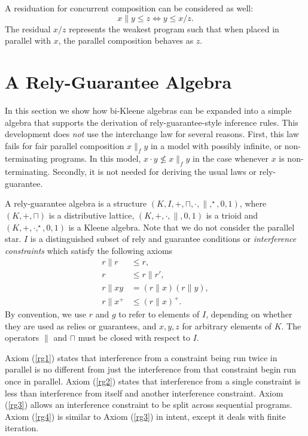 \documentclass{llncs}
\begin{document}
A residuation for concurrent composition can be considered as well:
\begin{equation*}
x\|y \le z \Leftrightarrow y \le x/z.
\end{equation*}
The residual $x/z$ represents the weakest program such that when
placed in parallel with $x$, the parallel composition behaves as $z$.


\section{A  Rely-Guarantee Algebra}
\label{sec:RG}

In this section we show how bi-Kleene algebras can be expanded into a
simple algebra that supports the derivation of rely-guarantee-style
inference rules. This development does \emph{not} use the interchange
law for several reasons. First, this law fails for fair parallel
composition $x\parallel_f y$ in a model with possibly infinite, or
non-terminating programs. In this model, $x \cdot y \not\leq x
\parallel_f y$ in the case whenever $x$ is non-terminating. Secondly,
it is not needed for deriving the usual laws or rely-guarantee.

A rely-guarantee algebra is a structure
$(K,I,+,\sqcap,\cdot,\|,^\star,0,1)$, where $(K,+,\sqcap)$ is a
distributive lattice, $(K,+,\cdot,\|,0,1)$ is a trioid and
$(K,+,\cdot,^\star,0,1)$ is a Kleene algebra. Note that we do not
consider the parallel star. $I$ is a distinguished subset of rely and
guarantee conditions or \emph{interference constraints} which satisfy
the following axioms
\begin{align}
r\|r &\le r, \label{rg1}\\
r &\le r\|r', \label{rg2}\\
r\|xy &= (r\|x)(r\|y), \label{rg3}\\
r\|x^+ &\le (r\|x)^+ \label{rg4}.
\end{align}
By convention, we use $r$ and $g$ to refer to elements of $I$,
depending on whether they are used as relies or guarantees, and
$x,y,z$ for arbitrary elements of $K$. The operators $\|$ and $\sqcap$
must be closed with respect to $I$.

Axiom (\ref{rg1}) states that interference from a constraint being run
twice in parallel is no different from just the interference from that
constraint begin run once in parallel. Axiom (\ref{rg2}) states that
interference from a single constraint is less than interference from
itself and another interference constraint. Axiom (\ref{rg3}) allows
an interference constraint to be split across sequential
programs. Axiom (\ref{rg4}) is similar to Axiom (\ref{rg3}) in intent,
except it deals with finite iteration.
\end{document}
